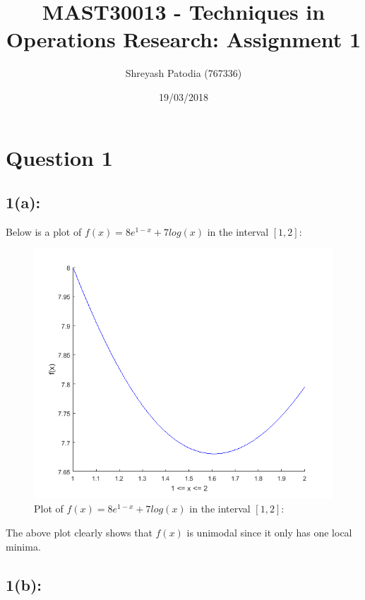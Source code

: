 \documentclass[a4paper]{article}
\title{MAST30013 - Techniques in Operations Research: Assignment 1}
\author{Shreyash Patodia (767336)}
\date{19/03/2018}
\begin{document}
\maketitle

\section*{Question 1}

\subsection*{1(a):}

Below is a plot of $f(x) = 8e^{1 -x} + 7log(x)$ in the interval $[1, 2]$:
\begin{figure}[!htbp]
\begin{center}
\includegraphics[scale=0.75]{problem-1.png}
\end{center}
\caption{Plot of $f(x) = 8e^{1 -x} + 7log(x)$ in the interval $[1, 2]$:}\label{exampleplot}
\end{figure}

The above plot clearly shows that $f(x)$ is unimodal since it only has one local minima.

\subsection*{1(b):}
\end{document}
